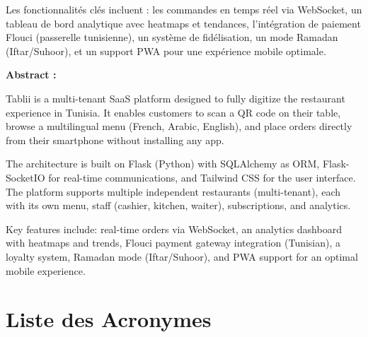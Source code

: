 \documentclass[12pt,a4paper]{report}
\begin{document}
Les fonctionnalit\'es cl\'es incluent : les commandes en temps r\'eel via WebSocket, un tableau 
de bord analytique avec heatmaps et tendances, l'int\'egration de paiement Flouci (passerelle 
tunisienne), un syst\`eme de fid\'elisation, un mode Ramadan (Iftar/Suhoor), et un support PWA 
pour une exp\'erience mobile optimale.

\vspace{0.5cm}

\noindent\textbf{Abstract :}

Tablii is a multi-tenant SaaS platform designed to fully digitize the restaurant experience in Tunisia. 
It enables customers to scan a QR code on their table, browse a multilingual menu (French, 
Arabic, English), and place orders directly from their smartphone without installing any app.

The architecture is built on Flask (Python) with SQLAlchemy as ORM, Flask-SocketIO for 
real-time communications, and Tailwind CSS for the user interface. The platform supports 
multiple independent restaurants (multi-tenant), each with its own menu, staff (cashier, 
kitchen, waiter), subscriptions, and analytics.

Key features include: real-time orders via WebSocket, an analytics dashboard with heatmaps 
and trends, Flouci payment gateway integration (Tunisian), a loyalty system, Ramadan mode 
(Iftar/Suhoor), and PWA support for an optimal mobile experience.

\cleardoublepage
\tableofcontents
\cleardoublepage
\listoffigures
{}
\cleardoublepage
\listoftables
{}

\cleardoublepage
\chapter*{Liste des Acronymes}
\end{document}

